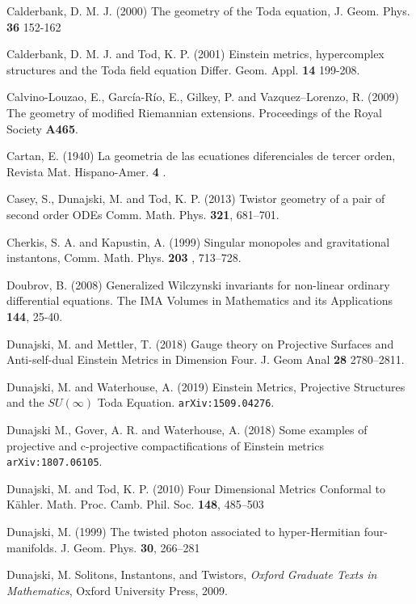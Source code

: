 \begin{thebibliography}{}
 Calderbank, D. M. J. (2000) The geometry of the Toda 
equation, J. Geom. Phys. {\bf 36}  152-162


 Calderbank, D. M. J. and Tod,  K. P. (2001)
Einstein metrics, hypercomplex structures and the Toda field equation
Differ. Geom. Appl. {\bf 14}  199-208.


 Calvino-Louzao, E., Garc\' ia-R\' io, E., Gilkey, P. and Vazquez--Lorenzo, R. (2009) The geometry of modified Riemannian extensions. Proceedings of the Royal Society {\bf A465}.

 Cartan, E. (1940) {La geometria de las ecuationes diferenciales de tercer
orden}, Revista Mat. Hispano-Amer. {\bf 4} .


 Casey, S., Dunajski, M. and Tod, K. P. (2013)
Twistor geometry of a pair of second order ODEs 
Comm. Math. Phys. { \bf 321}, 681--701.



 Cherkis, S. A.  and Kapustin, A. (1999) Singular monopoles and gravitational
instantons, Comm. Math. Phys. {\bf 203} , 713–728.


Doubrov, B. (2008) Generalized Wilczynski invariants for non-linear ordinary differential equations.
The IMA Volumes in Mathematics and its Applications {\bf 144}, 25-40.

 Dunajski, M. and Mettler, T. (2018) Gauge theory on Projective Surfaces and Anti-self-dual Einstein Metrics in Dimension Four.  
 J. Geom Anal {\bf 28} 2780--2811.
 
 Dunajski, M. and Waterhouse, A. (2019)
Einstein Metrics, Projective Structures and the $SU(\infty)$ Toda Equation.
{\tt{arXiv:1509.04276}}.
 

 Dunajski M., Gover, A. R. and Waterhouse, A. (2018) Some examples of projective and c-projective compactifications of Einstein metrics  {\tt arXiv:1807.06105}.

 Dunajski, M. and Tod, K. P. (2010) Four Dimensional Metrics Conformal to K\"ahler. Math. Proc. Camb. Phil. Soc. {\bf 148}, 485--503

 Dunajski, M. (1999) The twisted photon associated to hyper-Hermitian four-manifolds. J. Geom. Phys. {\bf 30}, 266--281

 Dunajski, M. Solitons, Instantons, and Twistors, {\em Oxford Graduate Texts in Mathematics}, Oxford University Press, 2009.


\end{thebibliography}
